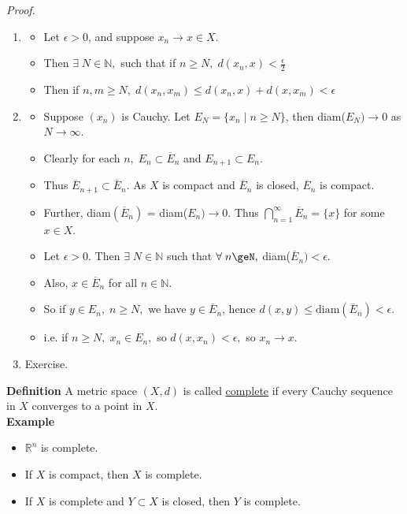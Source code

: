\documentclass[12pt]{article}
\begin{document}
{\sl Proof.}
\begin{enumerate}[label=(\roman*)]
\item
\begin{itemize}
    \item Let $\epsilon>0$, and suppose $x_n\to x\in X$.
    \item Then $\exists\; N\in\mathbb{N},$ such that if $n\ge N,\; d(x_n,x)<\frac{\epsilon}{2}$
    \item Then if $n,m\ge N,\; d(x_n,x_m)\le d(x_n,x)+d(x,x_m)<\epsilon$
\end{itemize}

\item 
\begin{itemize}
    \item Suppose $(x_n)$ is Cauchy. Let $E_N= \{x_n\;|\;n\ge N\}$, then diam($E_N) \to 0$ as $N\to\infty$.
    \item Clearly for each $n,\; E_n\subset \overline{E}_n$ and $E_{n+1}\subset E_n$.
    \item Thus $\overline{E}_{n+1} \subset \overline{E}_n$. As $X$ is compact and $\overline{E}_n$ is closed, $\overline{E}_n$ is compact.
    \item Further, diam$(\overline{E}_n)$ = diam($E_n)\to 0$. Thus $\bigcap\limits_{n=1}^\infty \overline{E}_n = \{x\}$ for some $x\in X$.
    \item Let $\epsilon >0$. Then $\exists\;N\in\mathbb{N}$ such that $\forall\;n\geN,$ diam($\overline{E}_n)<\epsilon$.
    \item Also, $x\in\overline{E}_n$ for all $n\in\mathbb{N}$.
    \item So if $y\in E_n,\; n\ge N,$ we have $y\in \overline{E}_n$, hence $d(x,y)\le \text{diam}(\overline{E}_n) <\epsilon$.
    \item i.e. if $n\ge N,\;x_n\in E_n,$ so $d(x,x_n)<\epsilon,$ so $x_n\to x$.
\end{itemize}
\item Exercise.
\end{enumerate}

\newpage
{\bf Definition} A metric space $(X,d)$ is called \underline{complete} if every Cauchy sequence in $X$ converges to a point in $X$.\\

{\bf Example}
\begin{itemize}
    \item $\mathbb{R}^n$ is complete.
    \item If $X$ is compact, then $X$ is complete.
    \item If $X$ is complete and $Y\subset X$ is closed, then $Y$ is complete.
\end{itemize}
\end{document}
